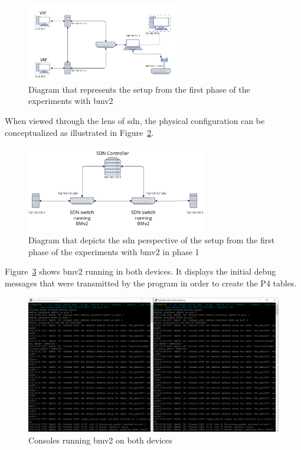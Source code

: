 \begin{figure}
	\centering
	\includegraphics[width=0.6\textwidth]{Chapters/Figures/tests/bmv2_phase_1/setup_diagram.PNG}
	\caption{Diagram that represents the setup from the first phase of the experiments with \gls{bmv2}}
	\label{fig:exp2_phase1_diagram}
\end{figure}

When viewed through the lens of \gls{sdn}, the physical configuration can be conceptualized as illustrated in Figure~\ref{fig:exp2_phase1_sdn_diagram}.

\begin{figure}
	\centering
	\includegraphics[width=0.7\textwidth]{Chapters/Figures/tests/bmv2_phase_1/sdn_diagram.PNG}
	\caption{Diagram that depicts the \gls{sdn} perspective of the setup from the first phase of the experiments with \gls{bmv2} in phase 1}
	\label{fig:exp2_phase1_sdn_diagram}
\end{figure}


Figure~\ref{fig:exp2_phase1_bmv2} shows \gls{bmv2} running in both devices. It displays the initial debug messages that were transmitted by the program in order to create the P4 tables.

\begin{figure}
	\centering
	\includegraphics[width=\textwidth]{Chapters/Figures/tests/bmv2_phase_1/bmv2_running.PNG}
	\caption{Consoles running \gls{bmv2} on both devices}
	\label{fig:exp2_phase1_bmv2}
\end{figure}


